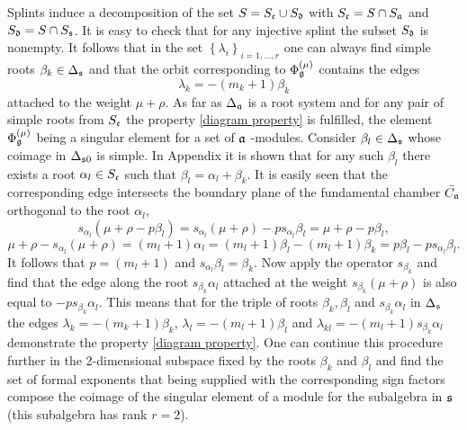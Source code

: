 Splints induce a decomposition of the set $S=S_{\frak{c}}\cup S_{\frak{d}}$
with $S_{\frak{c}}=S\cap S_{\mathfrak{a}}$ and $S_{\frak{d}}=S\cap S_{\frak{s}}$. 
It is easy to check that for any injective splint the subset $S_{%
\frak{d}}$ is nonempty. It follows that in the set $\left\{ \lambda
_{i}\right\} _{i=1,\dots ,r}$ one can always find simple roots $\beta
_{k}\in \Delta _{\frak{s}}$ and that the orbit corresponding to $\Phi _{%
\gf}^{\left( \mu \right) }$ contains the edges
\begin{equation}
\lambda _{k}=-\left( m_{k}+1\right) \beta _{k}  \label{beta edge}
\end{equation}
attached to the weight $\mu +\rho $. As far as $\Delta _{\mathfrak{a}}$ is a
root system and for any pair of simple roots from $S_{\frak{c}}$ the
property \ref{diagram property} is fulfilled, the element $\Phi _{\gf%
}^{\left( \mu \right) }$ being a singular element for a set of $\mathfrak{a}$%
-modules. Consider $\beta _{l}\in \Delta _{\frak{s}}$ whose coimage in $%
\Delta _{\frak{s}0}$ is simple. In Appendix it is shown that for any such $%
\beta _{l}$ there exists a root $\alpha _{l}\in S_{\frak{c}}$ such that
$\beta _{l}=\alpha _{l}+\beta _{k}$. It is easily seen that the
corresponding edge intersects the boundary plane of the fundamental chamber $%
\bar{C_{\af}}$ orthogonal to the root $\alpha _{l}$,
\begin{equation}
s_{\alpha _{l}}\left( \mu +\rho -p\beta _{l}\right) =s_{\alpha _{l}}\left(
\mu +\rho \right) -ps_{\alpha _{l}}\beta _{l}=\mu +\rho -p\beta _{l},
\label{intersection}
\end{equation}
\begin{equation}
\mu +\rho -s_{\alpha _{l}}\left( \mu +\rho \right) =\left( m_{l}+1\right)
\alpha _{l}=\left( m_{l}+1\right) \beta _{l}-\left( m_{l}+1\right) \beta
_{k}=p\beta _{l}-ps_{\alpha _{l}}\beta _{l}.  
\label{intersection-2}
\end{equation}
It follows that $p=\left( m_{l}+1\right) $ and $s_{\alpha _{l}}\beta
_{l}=\beta _{k}$. Now apply the operator $s_{\beta _{k}}$ and find that the
edge along the root $s_{\beta _{k}}\alpha _{l}$ attached at the weight $%
s_{\beta _{k}}(\mu +\rho )$ is also equal to $-ps_{\beta _{k}}\alpha _{l}$.
This means that for the triple of roots $\beta _{k},\beta _{l}$ and $%
s_{\beta _{k}}\alpha _{l}$ in $\Delta _{\frak{s}}$ the edges $\lambda
_{k}=-\left( m_{k}+1\right) \beta _{k}$, $\lambda _{l}=-\left(
m_{l}+1\right) \beta _{l}$ and $\lambda _{kl}=-\left( m_{l}+1\right)
s_{\beta _{k}}\alpha _{l}$ demonstrate the property \ref{diagram property}.
One can continue this procedure further in the 2-dimensional subspace fixed
by the roots $\beta _{k}$ and $\beta _{l}$ and find the set of formal
exponents that being supplied with the corresponding sign factors compose
the coimage of the singular element of a module for the subalgebra in $\frak{%
s}$ (this subalgebra has rank $r=2$).

